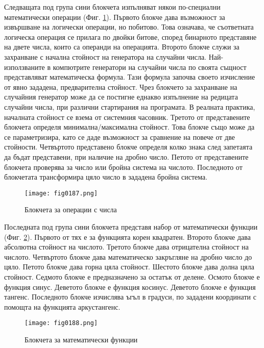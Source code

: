 Следващата под група сини блокчета изпълняват някои по-специални математически операции (Фиг. \ref{fig0187}). Първото блокче дава възможност за извършване на логически операции, но побитово. Това означава, че съответната логическа операция се прилага по двойки битове, според бинарното представяне на двете числа, които са операнди на операцията. Второто блокче служи за захранване с начална стойност на генератора на случайни числа. Най-използваните в компютрите генератори на случайни числа по своята същност представляват математическа формула. Тази формула започва своето изчисление от явно зададена, предварителна стойност. Чрез блокчето за захранване на случайния генератор може да се постигне еднакво изпълнение на редицата случайни числа, при различни стартирания на програмата. В реалната практика, началната стойност се взема от системния часовник. Третото от представените блокчета определя минимална/максимална стойност. Това блокче също може да се параметризира, като се даде възможност за сравнение на повече от две стойности. Четвъртото представено блокче определя колко знака след запетаята да бъдат представени, при наличие на дробно число. Петото от представените блокчета проверява за число или бройна система на числото. Последното от блокчетата трансформира цяло число в зададена бройна система. 

\begin{figure}[H]
  \centering
  \texttt{[image: fig0187.png]}
  \caption{Блокчета за операции с числа}
\label{fig0187}
\end{figure}

Последната под група сини блокчета представя набор от математически функции (Фиг. \ref{fig0188}). Първото от тях е за функцията корен квадратен. Второто блокче дава абсолютна стойност на числото. Третото блокче дава отрицателна стойност на числото. Четвъртото блокче дава математическо закръгляне на дробно число до цяло. Петото блокче дава горна цяла стойност. Шестото блокче дава долна цяла стойност. Седмото блокче е предназначено за остатък от делене. Осмото блокче е функция синус. Деветото блокче е функция косинус. Деветото блокче е функция тангенс. Последното блокче изчислява ъгъл в градуси, по зададени координати с помощта на функцията аркустангенс. 

\begin{figure}[H]
  \centering
  \texttt{[image: fig0188.png]}
  \caption{Блокчета за математически функции}
\label{fig0188}
\end{figure}

